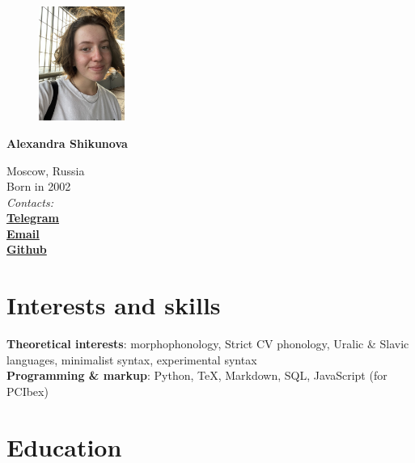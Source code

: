 \documentclass[11pt]{article} %
\begin{document}

\begin{figure} %
    \centering
    \includegraphics[width=0.25\textwidth]{photo}
\end{figure}
{\LARGE\bfseries Alexandra Shikunova} %
\bigskip\bigskip\medskip %

Moscow, Russia\\
Born in 2002\\

\textit{Contacts:}\\
\textbf{\href{https://t.me/thnlgrlivrlvdwsbrnwthrssnhrys}{Telegram}}\\
\textbf{\href{mailto:notalexandrashikunova@gmail.com}{Email}}\\
\textbf{\href{https://github.com/poisongrapevine}{Github}}
\medskip %


\section*{Interests and skills}

\textbf{Theoretical interests}: morphophonology, Strict CV phonology, Uralic \& Slavic languages, minimalist syntax, experimental syntax\\
\textbf{Programming \& markup}: Python, TeX, Markdown, SQL, JavaScript (for PCIbex)


\section*{Education}
\end{document}
